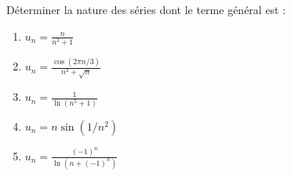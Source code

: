 
Déterminer la nature des séries dont le terme général est :

\begin{multicols}{2}
\begin{enumerate}[itemsep=0.5em]
\item $u_n=\frac{n}{n^3+1}$
\item $u_n=\frac{\cos(2\pi n / 3)}{n^2+\sqrt{n}}$
\item $u_n=\frac{1}{\ln \left(n^5+1\right)}$
\item $u_n=n \sin (1 / n^2)$
\item $u_n=\frac{(-1)^n}{\ln \left(n+(-1)^n\right)}$
\end{enumerate}
\end{multicols}